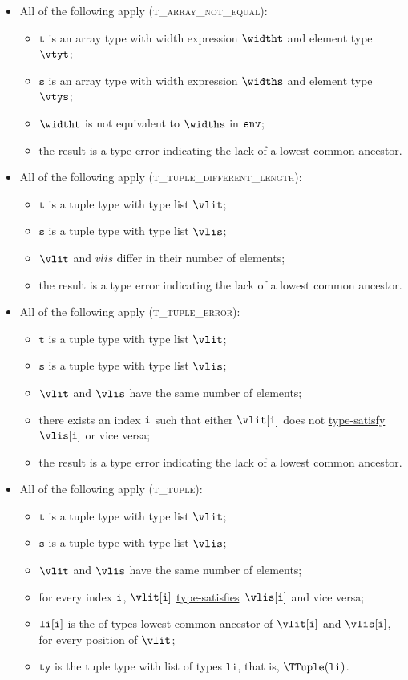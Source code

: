 \documentclass{book}
\newcommand\typesatisfies[0]{\hyperlink{def-typesatisfies}{type-satisfies}}
\newcommand\typesatisfy[0]{\hyperlink{def-typesatisfies}{type-satisfy}}
\newcommand\vt[0]{\texttt{t}}
\newcommand\vs[0]{\texttt{s}}
\newcommand\tty[0]{\texttt{ty}}
\newcommand\vli[0]{\texttt{li}}
\begin{document}
\begin{itemize}
\begin{itemize}
    \item All of the following apply (\textsc{t\_array\_not\_equal}):
    \begin{itemize}
      \item $\vt$ is an array type with width expression $\widtht$ and element type $\vtyt$;
      \item $\vs$ is an array type with width expression $\widths$ and element type $\vtys$;
      \item $\widtht$ is not equivalent to $\widths$ in $\texttt{env}$;
      \item the result is a type error indicating the lack of a lowest common ancestor.
    \end{itemize}

    \item All of the following apply (\textsc{t\_tuple\_different\_length}):
    \begin{itemize}
      \item $\vt$ is a tuple type with type list $\vlit$;
      \item $\vs$ is a tuple type with type list $\vlis$;
      \item $\vlit$ and $vlis$ differ in their number of elements;
      \item the result is a type error indicating the lack of a lowest common ancestor.
    \end{itemize}

    \item All of the following apply (\textsc{t\_tuple\_error}):
    \begin{itemize}
      \item $\vt$ is a tuple type with type list $\vlit$;
      \item $\vs$ is a tuple type with type list $\vlis$;
      \item $\vlit$ and $\vlis$ have the same number of elements;
      \item there exists an index $\texttt{i}$ such that either $\vlit[\vi]$ does not \typesatisfy\ $\vlis[\vi]$ or vice versa;
      \item the result is a type error indicating the lack of a lowest common ancestor.
    \end{itemize}

    \item All of the following apply (\textsc{t\_tuple}):
    \begin{itemize}
      \item $\vt$ is a tuple type with type list $\vlit$;
      \item $\vs$ is a tuple type with type list $\vlis$;
      \item $\vlit$ and $\vlis$ have the same number of elements;
      \item for every index $\texttt{i}$, $\vlit[\vi]$ \typesatisfies\ $\vlis[\vi]$ and vice versa;
      \item $\vli[\vi]$ is the of types lowest common ancestor of $\vlit[\vi]$ and $\vlis[\vi]$, for every position of $\vlit$;
      \item $\tty$ is the tuple type with list of types $\vli$, that is, $\TTuple(\vli)$.
    \end{itemize}


\end{itemize}
\end{itemize}
\end{document}
